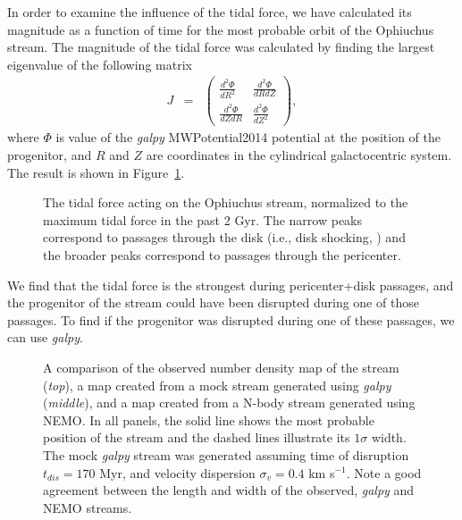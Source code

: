 \documentclass[iop]{emulateapj}
\begin{document}
In order to examine the influence of the tidal force, we have calculated its
magnitude as a function of time for the most probable orbit of the Ophiuchus
stream. The magnitude of the tidal force was calculated by finding the largest
eigenvalue of the following matrix
\begin{eqnarray}
J & = &
\left(
\begin{array}{cc}
    \frac{d^2\Phi}{dR^2} & \frac{d^2\Phi}{dRdZ} \\
    \frac{d^2\Phi}{dZdR} & \frac{d^2\Phi}{dZ^2}
\end{array}
\right),
\end{eqnarray}
where $\Phi$ is value of the {\em galpy} MWPotential2014 potential at the
position of the progenitor, and $R$ and $Z$ are coordinates in the cylindrical
galactocentric system. The result is shown in Figure~\ref{tidal_force}.

\begin{figure}
\caption{
The tidal force acting on the Ophiuchus stream, normalized to the maximum tidal
force in the past 2 Gyr. The narrow peaks correspond to passages through the
disk (i.e., disk shocking, \citealt{osc72}) and the broader peaks correspond to
passages through the pericenter.
\label{tidal_force}}
\end{figure}

We find that the tidal force is the strongest during pericenter+disk passages,
and the progenitor of the stream could have been disrupted during one of those
passages. To find if the progenitor was disrupted during one of these passages,
we can use {\em galpy}.

\begin{figure}


\caption{
A comparison of the observed number density map of the stream ({\em top}), a map
created from a mock stream generated using {\em galpy} ({\em middle}), and a map
created from a N-body stream generated using NEMO. In all panels, the solid line
shows the most probable position of the stream and the dashed lines illustrate
its $1\sigma$ width. The mock {\em galpy} stream was generated assuming time of
disruption $t_{dis}=170$ Myr, and velocity dispersion $\sigma_{v}=0.4$ km
s$^{-1}$. Note a good agreement between the length and width of the observed,
{\em galpy} and NEMO streams.
\label{observed_vs_mock_comparison}}
\end{figure}
\end{document}
